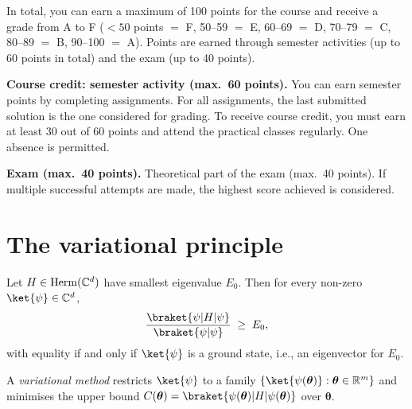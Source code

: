 \documentclass[handoutsbeamer.tex]{subfiles}
\begin{document}
\begin{frame}
In total, you can earn a maximum of 100 points for the course and receive a grade from A to F ($<50$ points $=$ F, 50--59 $=$ E, 60--69 $=$ D, 70--79 $=$ C, 80--89 $=$ B, 90--100 $=$ A).
Points are earned through semester activities (up to 60 points in total) and the exam (up to 40 points).

\textbf{Course credit: semester activity (max.\ 60 points).}
You can earn semester points by completing assignments.
For all assignments, the last submitted solution is the one considered for grading.
To receive course credit, you must earn at least 30 out of 60 points and attend the practical classes regularly. One absence is permitted.

\textbf{Exam (max.\ 40 points).}
Theoretical part of the exam (max.\ 40 points). If multiple successful attempts are made, the highest score achieved is considered.
\end{frame}

\section{The variational principle}


\begin{frame}
\begin{thm}\label{thm:ch01:variational}
Let $H \in \mathrm{Herm}(\mathbb{C}^{d})$ have smallest eigenvalue $E_0$. Then for every non-zero $\ket{\psi} \in \C^d$,
\begin{equation}
    \frac{\braket{\psi|H|\psi}}{\braket{\psi|\psi}} \;\geq\; E_0,
\end{equation}
with equality if and only if $\ket{\psi}$ is a ground state, i.e., an eigenvector for $E_0$.
\end{thm}
A \emph{variational method} restricts $\ket{\psi}$ to a family $\{\ket{\psi(\boldsymbol\theta)} : \boldsymbol\theta \in \R^m\}$ and minimises the upper bound $C(\boldsymbol\theta) = \braket{\psi(\boldsymbol\theta)|H|\psi(\boldsymbol\theta)}$ over $\boldsymbol\theta$.
\end{frame}
\end{document}

